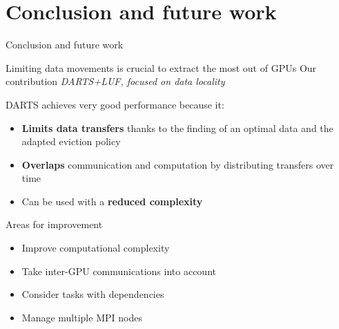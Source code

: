 \documentclass{libs/ufc_format}
\begin{document}
\section{Conclusion and future work}
\begin{frame}{Conclusion and future work}
\begin{block}{Limiting data movements is crucial to extract the most out of GPUs}
	Our contribution \MVRightarrow{}
	\emph{DARTS+LUF, focused on data locality}
\end{block}
\begin{exampleblock}{DARTS achieves very good performance because it:}
		\begin{itemize}
			\item \textbf{Limits data transfers} thanks to the finding of an optimal data and the adapted eviction policy 
			\item \textbf{Overlaps} communication and computation by distributing transfers over time
			\item Can be used with a \textbf{reduced complexity}
		\end{itemize}
\end{exampleblock}
		
	\begin{exampleblock}{Areas for improvement}
		\begin{itemize}
		\item Improve computational complexity
		\item Take inter-GPU communications into account
		\item Consider tasks with dependencies
		\item Manage multiple MPI nodes
		\end{itemize}
	\end{exampleblock}
\end{frame}
\end{document}
